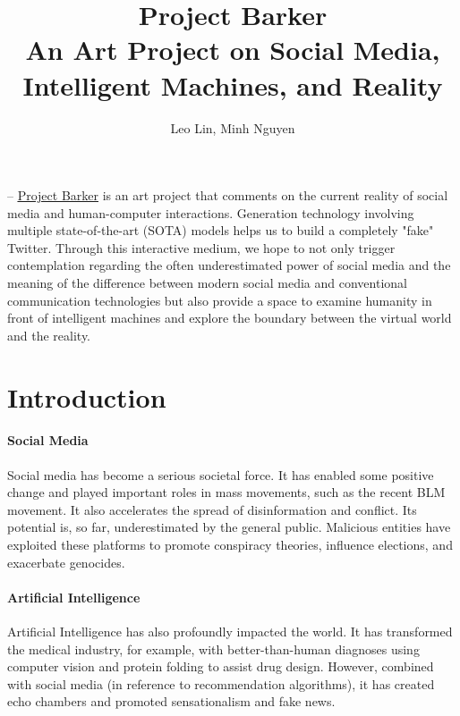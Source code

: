 \documentclass[12pt, letterpaper]{article}
\begin{document}
\title{%
\huge \textbf{Project Barker}\\
\large An Art Project on Social Media, Intelligent Machines, and Reality}

\author{Leo Lin, Minh Nguyen}

\maketitle

\newpage
\abstractname{ -- \href{https://twitter-clone-sstp.appspot.com/}{\underline{Project Barker}} is an art project that comments on the current reality of social media and human-computer interactions. Generation technology involving multiple state-of-the-art (SOTA) models helps us to build a completely "fake" Twitter. Through this interactive medium, we hope to not only trigger contemplation regarding the often underestimated power of social media and the meaning of the difference between modern social media and conventional communication technologies but also provide a space to examine humanity in front of intelligent machines and explore the boundary between the virtual world and the reality.}

\section{Introduction}

\paragraph{Social Media}Social media has become a serious societal force. It has enabled some positive change and played important roles in mass movements, such as the recent BLM movement. It also accelerates the spread of disinformation and conflict. Its potential is, so far, underestimated by the general public. Malicious entities have exploited these platforms to promote conspiracy theories, influence elections, and exacerbate genocides.

\paragraph{Artificial Intelligence}Artificial Intelligence has also profoundly impacted the world. It has transformed the medical industry, for example, with better-than-human diagnoses using computer vision and protein folding to assist drug design. However, combined with social media (in reference to recommendation algorithms), it has created echo chambers and promoted sensationalism and fake news.
\end{document}
